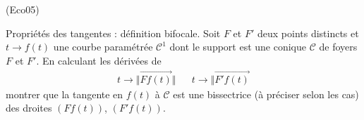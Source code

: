 \begin{tiny}(Eco05)\end{tiny} Propriétés des tangentes : définition bifocale.\newline
Soit $F$ et $F'$ deux points distincts et $t\rightarrow f(t)$ une courbe paramétrée $\mathcal{C}^1$ dont le support est une conique $\mathcal C$ de foyers $F$ et $F'$. En calculant les dérivées de
\begin{align*}
 t\rightarrow \Vert \overrightarrow{Ff(t)}\Vert & &
 t\rightarrow \Vert \overrightarrow{F'f(t)}
\end{align*}
montrer que la tangente en $f(t)$ à $\mathcal C$ est une bissectrice (à préciser selon les cas) des droites $(Ff(t))$, $(F'f(t))$.
